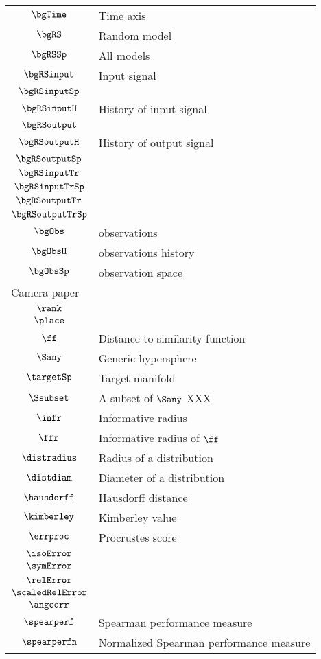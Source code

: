 \begin{longtable}{cl}
 \hline
$\bgTime$ &  Time axis\\ 
 $\bgRS$ &  Random model\\ 
 $\bgRSSp$ &  All models\\ 
 $\bgRSinput$ &  Input signal\\ 
 $\bgRSinputSp$ &  \\ 
 $\bgRSinputH$ &  History of input signal\\ 
 $\bgRSoutput$ & \\ 
 $\bgRSoutputH$ &  History of output signal\\ 
 $\bgRSoutputSp$ &  \\ 
 $\bgRSinputTr$ &  \\ 
 $\bgRSinputTrSp$ &  \\ 
 $\bgRSoutputTr$ &  \\ 
 $\bgRSoutputTrSp$ & \\ 
 $\bgObs$ &  observations\\ 
 $\bgObsH$ &  observations history\\ 
 $\bgObsSp$ &  observation space\\ 
 \multicolumn{2}{l}{Camera paper}\\ 
 \hline
$\rank$ & \\ 
 $\place$ & \\ 
 $\ff$ &  Distance to similarity function\\ 
 $\Sany$ &  Generic hypersphere\\ 
 $\targetSp$ &  Target manifold\\ 
 $\Ssubset$ &  A subset of $\Sany$  XXX\\ 
 $\infr$ &  Informative radius\\ 
 $\ffr$ &  Informative radius of $\ff$\\ 
 $\distradius$ &  Radius of a distribution\\ 
 $\distdiam$ &  Diameter of a distribution\\ 
 $\hausdorff$ &  Hausdorff distance\\ 
 $\kimberley$ &  Kimberley value\\ 
 $\errproc$ &  Procrustes score\\ 
 $\isoError$ & \\ 
 $\symError$ & \\ 
 $\relError$ & \\ 
 $\scaledRelError$ & \\ 
 $\angcorr$ & \\ 
 $\spearperf$ &  Spearman performance measure\\ 
 $\spearperfn$ &  Normalized Spearman performance measure\\ 

\end{longtable}
